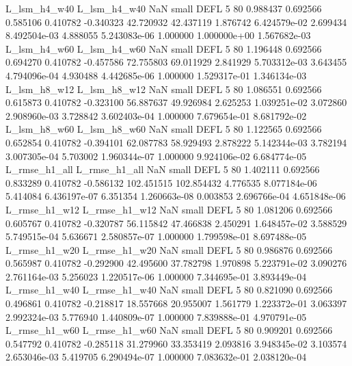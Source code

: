   L_lsm_h4_w40   L_lsm_h4_w40                   NaN      small     DEFL                 5 80 0.988437       0.692566 0.585106       0.410782   -0.340323     42.720932     42.437119     1.876742   6.424579e-02  2.699434 8.492504e-03     4.888055   5.243083e-06            1.000000    1.000000e+00        1.567682e-03
  L_lsm_h4_w60   L_lsm_h4_w60                   NaN      small     DEFL                 5 80 1.196448       0.692566 0.694270       0.410782   -0.457586     72.755803     69.011929     2.841929   5.703312e-03  3.643455 4.794096e-04     4.930488   4.442685e-06            1.000000    1.529317e-01        1.346134e-03
  L_lsm_h8_w12   L_lsm_h8_w12                   NaN      small     DEFL                 5 80 1.086551       0.692566 0.615873       0.410782   -0.323100     56.887637     49.926984     2.625253   1.039251e-02  3.072860 2.908960e-03     3.728842   3.602403e-04            1.000000    7.679654e-01        8.681792e-02
  L_lsm_h8_w60   L_lsm_h8_w60                   NaN      small     DEFL                 5 80 1.122565       0.692566 0.652854       0.410782   -0.394101     62.087783     58.929493     2.878222   5.142344e-03  3.782194 3.007305e-04     5.703002   1.960344e-07            1.000000    9.924106e-02        6.684774e-05
 L_rmse_h1_all  L_rmse_h1_all                   NaN      small     DEFL                 5 80 1.402111       0.692566 0.833289       0.410782   -0.586132    102.451515    102.854432     4.776535   8.077184e-06  5.414084 6.436197e-07     6.351354   1.260663e-08            0.003853    2.696766e-04        4.651848e-06
 L_rmse_h1_w12  L_rmse_h1_w12                   NaN      small     DEFL                 5 80 1.081206       0.692566 0.605767       0.410782   -0.320787     56.115842     47.466838     2.450291   1.648457e-02  3.588529 5.749515e-04     5.636671   2.580857e-07            1.000000    1.799598e-01        8.697488e-05
 L_rmse_h1_w20  L_rmse_h1_w20                   NaN      small     DEFL                 5 80 0.986876       0.692566 0.565987       0.410782   -0.292900     42.495600     37.782798     1.970898   5.223791e-02  3.090276 2.761164e-03     5.256023   1.220517e-06            1.000000    7.344695e-01        3.893449e-04
 L_rmse_h1_w40  L_rmse_h1_w40                   NaN      small     DEFL                 5 80 0.821090       0.692566 0.496861       0.410782   -0.218817     18.557668     20.955007     1.561779   1.223372e-01  3.063397 2.992324e-03     5.776940   1.440809e-07            1.000000    7.839888e-01        4.970791e-05
 L_rmse_h1_w60  L_rmse_h1_w60                   NaN      small     DEFL                 5 80 0.909201       0.692566 0.547792       0.410782   -0.285118     31.279960     33.353419     2.093816   3.948345e-02  3.103574 2.653046e-03     5.419705   6.290494e-07            1.000000    7.083632e-01        2.038120e-04

